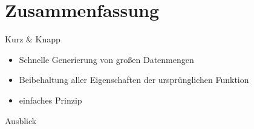 \section{Zusammenfassung}

\begin{frame}{Kurz \& Knapp}    
    \begin{itemize}
        \item Schnelle Generierung von großen Datenmengen
        \item Beibehaltung aller Eigenschaften der ursprünglichen Funktion
        \item einfaches Prinzip
    \end{itemize}
\end{frame}

\begin{frame}{Ausblick}   

\end{frame}